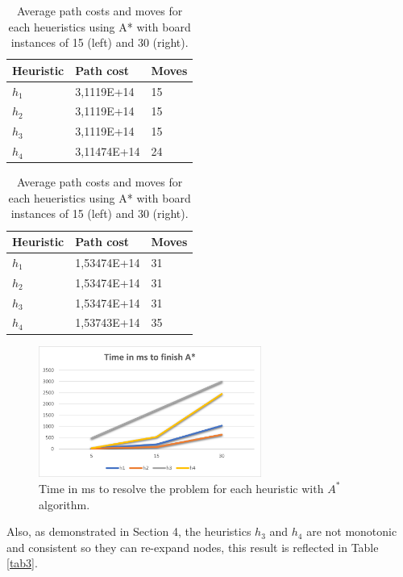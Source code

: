 \documentclass[runningheads]{llncs}
\begin{document}
\begin{table}[!htb]
    \begin{minipage}{.5\linewidth}
      \centering
      \begin{tabular}{|l|l|l|}
        \hline
        Heuristic & Path cost & Moves\\
        \hline
        $h_1$ & 3,1119E+14 & 15\\
        $h_2$ & 3,1119E+14 & 15\\
        $h_3$ & 3,1119E+14 & 15\\
        $h_4$ & 3,11474E+14 & 24\\
        \hline
        \end{tabular}
    \end{minipage}%
    \begin{minipage}{.5\linewidth}
      \centering
        \begin{tabular}{|l|l|l|}
            \hline
            Heuristic & Path cost & Moves\\
            \hline
            $h_1$ & 1,53474E+14    & 31\\
            $h_2$ & 1,53474E+14    & 31\\
            $h_3$ & 1,53474E+14    & 31\\
            $h_4$ & 1,53743E+14    & 35\\
            \hline
            \end{tabular}
    \end{minipage} 
    \caption{Average path costs and moves for each heueristics using A* with board instances of 15 (left) and 30 (right).}\label{tab1}
\end{table}
\begin{figure}
    \centering
    \includegraphics[width=0.65\textwidth]{seconds_A.png}
    \caption{Time in ms to resolve the problem for each heuristic with $A^*$ algorithm.} \label{fig2}
\end{figure}
Also, as demonstrated in Section 4, the heuristics $h_3$ and $h_4$ are not monotonic and consistent so they can re-expand nodes, this result is reflected in Table \ref{tab3}.
\end{document}
